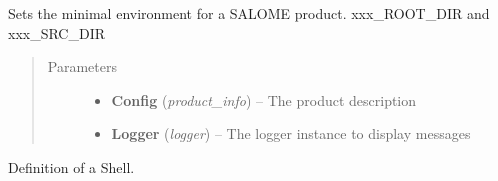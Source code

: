 \documentclass[a4paper,10pt,english]{sphinxmanual}
\begin{document}
\begin{fulllineitems}
\begin{fulllineitems}
\begin{quote}
\begin{description}
\end{description}\end{quote}

\end{fulllineitems}


\begin{fulllineitems}
\label{commands/apidoc/src:src.environment.SalomeEnviron.set_salome_minimal_product_env}
Sets the minimal environment for a SALOME product.
xxx\_ROOT\_DIR and xxx\_SRC\_DIR
\begin{quote}\begin{description}
\item[{Parameters}] \leavevmode\begin{itemize}
\item {} 
\textbf{Config} (\emph{product\_info}) -- The product description

\item {} 
\textbf{Logger} (\emph{logger}) -- The logger instance to display messages

\end{itemize}

\end{description}\end{quote}

\end{fulllineitems}


\end{fulllineitems}


\begin{fulllineitems}
\label{commands/apidoc/src:src.environment.Shell}
Definition of a Shell.

\end{fulllineitems}

\end{document}
